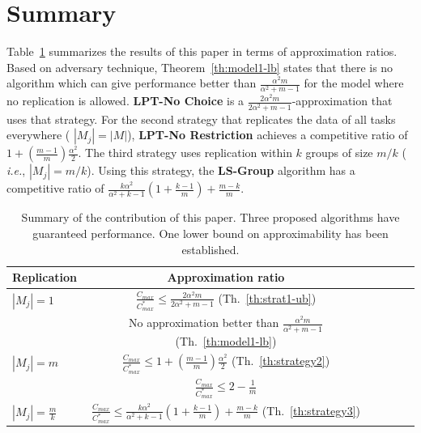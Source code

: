 \documentclass[10pt, conference, compsocconf]{IEEEtran}
\begin{document}
\section{Summary}\label{sec7}
Table~\ref{tab:template} summarizes the results of this paper in terms
of approximation ratios. Based on adversary technique,
Theorem~\ref{th:model1-lb} states that there is no algorithm which can
give performance better than $\frac{\alpha^{2}m }{\alpha^{2} + m-1}$ for the model where no
replication is allowed. {\bf LPT-No Choice} is a
$\frac{2\alpha^{2}m}{2\alpha^{2}+ m-1}$-approximation that uses that
strategy. For the second strategy that replicates the data of all
tasks everywhere ( $|M_j| = |M|$), {\bf LPT-No Restriction} achieves a
competitive ratio of $1 + (\frac{m-1}{m})\frac{\alpha^{2}}{2}$.  The
third strategy uses replication within $k$ groups of size $m/k$ ({\em
  i.e.}, $|M_j| = m/k$). Using this strategy, the {\bf LS-Group}
algorithm has a competitive ratio of
$\frac{k\alpha^{2}}{\alpha^{2}+k-1}\left( 1+ {\frac{k-1}{m}} \right) +
{\frac{m-k}{m}}$.



\begin{table}[ht]
  \centering
  \begin{tabular}{|l|c|c|c|c|c|}
    \hline
    Replication & Approximation ratio  \\
    \hline
    $|M_j|=1$ & $\frac{C_{max}}{C_{max}^{*}}\leq \frac{2\alpha^{2}m}{2\alpha^{2}+ m-1}$ (Th.~\ref{th:strat1-ub})  \\
    & No approximation better than $\frac{\alpha^{2}m }{\alpha^{2} + m-1}$ (Th.~\ref{th:model1-lb})   \\
    
    \hline
    $|M_j|=m$ & $\frac{C_{max}}{C_{max}^{*}} \leq 1 + (\frac{m-1}{m})\frac{\alpha^{2}}{2}$ (Th.~\ref{th:strategy2})  \\
    & $\frac{C_{max}}{C_{max}^{*}} \leq 2-\frac{1}{m}$ \cite{Graham66}   \\
    \hline
    
    $|M_j|= \frac{m}{k} $ & $\frac{C_{max}}{C_{max}^{*}} \leq \frac{k\alpha^{2}}{\alpha^{2}+k-1} \left(1+ {\frac{k-1}{m}} \right)+ {\frac{m-k}{m}}$ (Th.~\ref{th:strategy3})  \\
    
    \hline
  \end{tabular}
  \caption{Summary of the contribution of this paper.
    Three proposed algorithms have guaranteed performance.
    One lower bound on approximability has been established.}
  \label{tab:template}
\end{table}
\end{document}
